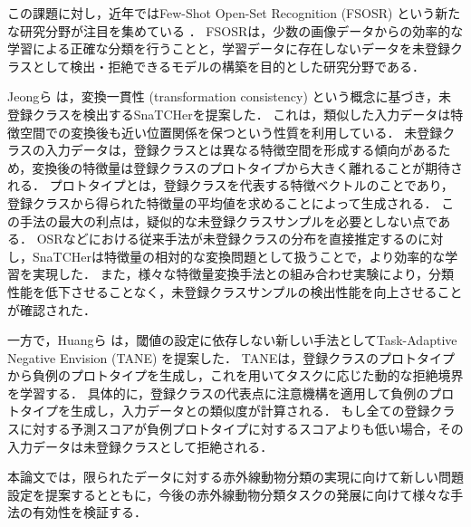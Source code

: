 この課題に対し，近年ではFew-Shot Open-Set Recognition (FSOSR) という新たな研究分野が注目を集めている \cite{peeler, che2023}．
FSOSRは，少数の画像データからの効率的な学習による正確な分類を行うことと，学習データに存在しないデータを未登録クラスとして検出・拒絶できるモデルの構築を目的とした研究分野である．

Jeongら \cite{snatcher}は，変換一貫性 (transformation consistency) という概念に基づき，未登録クラスを検出するSnaTCHerを提案した．
これは，類似した入力データは特徴空間での変換後も近い位置関係を保つという性質を利用している．
未登録クラスの入力データは，登録クラスとは異なる特徴空間を形成する傾向があるため，変換後の特徴量は登録クラスのプロトタイプから大きく離れることが期待される．
プロトタイプとは，登録クラスを代表する特徴ベクトルのことであり，登録クラスから得られた特徴量の平均値を求めることによって生成される．
この手法の最大の利点は，疑似的な未登録クラスサンプルを必要としない点である．
OSRなどにおける従来手法が未登録クラスの分布を直接推定するのに対し，SnaTCHerは特徴量の相対的な変換問題として扱うことで，より効率的な学習を実現した．
また，様々な特徴量変換手法との組み合わせ実験により，分類性能を低下させることなく，未登録クラスサンプルの検出性能を向上させることが確認された．

一方で，Huangら \cite{tane}は，閾値の設定に依存しない新しい手法としてTask-Adaptive Negative Envision (TANE) を提案した．
TANEは，登録クラスのプロトタイプから負例のプロトタイプを生成し，これを用いてタスクに応じた動的な拒絶境界を学習する．
具体的に，登録クラスの代表点に注意機構を適用して負例のプロトタイプを生成し，入力データとの類似度が計算される．
もし全ての登録クラスに対する予測スコアが負例プロトタイプに対するスコアよりも低い場合，その入力データは未登録クラスとして拒絶される．

本論文では，限られたデータに対する赤外線動物分類の実現に向けて新しい問題設定を提案するとともに，今後の赤外線動物分類タスクの発展に向けて様々な手法の有効性を検証する．